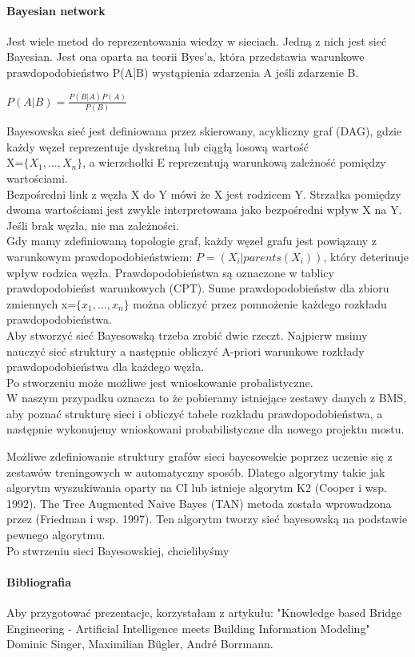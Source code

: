 \documentclass[11pt,a4paper]{article}
\begin{document}
\paragraph{Bayesian network}
Jest wiele metod do reprezentowania wiedzy w sieciach. Jedną z nich jest sieć Bayesian. Jest ona oparta na teorii Byes'a, która przedstawia warunkowe prawdopodobieństwo P(A|B) wystąpienia zdarzenia A jeśli zdarzenie B.\\
\begin{center}
$P(A|B)=\frac{P(B|A)P(A)}{P(B)}$
\end{center}
Bayesowska sieć jest definiowana przez skierowany, acykliczny graf (DAG), gdzie każdy węzeł reprezentuje dyskretną lub ciągłą 
losową wartość \\
X=$\lbrace{X}_{1}, \ldots, {X}_{n}\rbrace$, a wierzchołki E reprezentują warunkową zależność pomiędzy wartościami.\\
Bezpośredni link z węzła X do Y mówi że X jest rodzicem Y. Strzałka pomiędzy dwoma wartościami jest zwykle interpretowana jako bezpośredni wpływ X na Y. Jeśli brak węzła, nie ma zależności. \\
Gdy mamy zdefiniowaną topologie graf, każdy węzeł grafu jest powiązany z warunkowym prawdopodobieństwiem: $P = ({X}_{i}|parents({X}_{i}))$, który deterinuje wpływ rodzica węzła. Prawdopodobieństwa są oznaczone w tablicy prawdopodobieńst warunkowych (CPT). Sume prawdopodobieństw dla zbioru zmiennych x=$\lbrace{x}_{1}, \ldots, {x}_{n}\rbrace$ można obliczyć przez pomnożenie każdego rozkładu prawdopodobieństwa.\\
Aby stworzyć sieć Bayesowską trzeba zrobić dwie rzeczt. Najpierw msimy nauczyć sieć struktury a następnie obliczyć A-priori warunkowe rozkłady prawdopodobieństwa dla każdego węzła.\\
Po stworzeniu może możliwe jest wnioskowanie probalistyczne.\\
W naszym przypadku oznacza to że pobieramy istniejące zestawy danych z BMS, aby poznać strukturę sieci i obliczyć
tabele rozkładu prawdopodobieństwa, a następnie wykonujemy wnioskowani probabilistyczne dla nowego projektu mostu.

Możliwe zdefiniowanie struktury grafów sieci bayesowskie poprzez uczenie się z zestawów treningowych w automatyczny sposób. Dlatego algorytmy takie jak algorytm wyszukiwania oparty na CI lub istnieje algorytm K2 (Cooper i wsp. 1992). The Tree Augmented Naive Bayes (TAN) metoda została wprowadzona przez (Friedman i wsp. 1997). Ten algorytm tworzy sieć bayesowską
na podstawie pewnego algorytmu.\\
Po stwrzeniu sieci Bayesowskiej, chcielibyśmy 

\paragraph{Bibliografia}
Aby przygotować prezentacje, korzystałam z artykułu: "Knowledge based Bridge Engineering - Artificial Intelligence meets Building Information Modeling" Dominic Singer, Maximilian Bügler, André Borrmann. 
\end{document}
